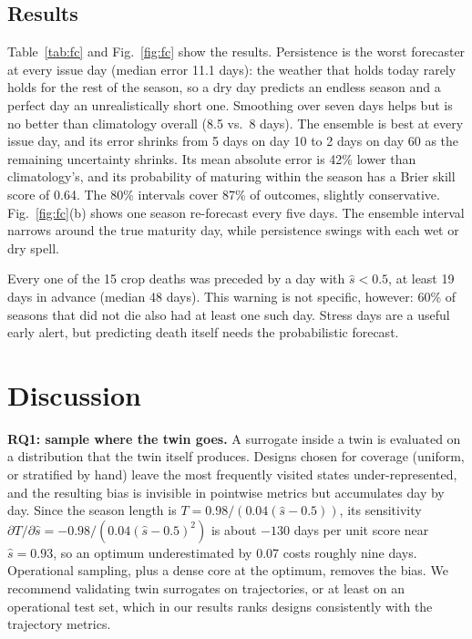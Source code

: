 \documentclass[conference]{IEEEtran}
\begin{document}
\subsection{Results}
Table~\ref{tab:fc} and Fig.~\ref{fig:fc} show the results. Persistence is the worst forecaster at
every issue day (median error 11.1 days): the weather that holds today rarely holds for the
rest of the season, so a dry day predicts an endless season and a perfect day an unrealistically
short one. Smoothing over seven days helps but is no better than climatology overall
(8.5 vs.\ 8 days). The ensemble is best
at every issue day, and its error shrinks from 5 days on day 10 to 2
days on day 60 as the remaining uncertainty shrinks. Its mean absolute error is 42\% lower
than climatology's, and its probability of maturing within the season has a Brier skill score of
0.64. The 80\% intervals cover 87\% of outcomes, slightly conservative.
Fig.~\ref{fig:fc}(b) shows one season re-forecast every five days. The ensemble interval narrows
around the true maturity day, while persistence swings with each wet or dry spell.

Every one of the 15 crop deaths was preceded by a day with $\hat s < 0.5$, at least
19 days in advance (median 48 days). This warning is not specific, however: 60\%
of seasons that did not die also had at least one such day. Stress days are a useful early alert,
but predicting death itself needs the probabilistic forecast.

\section{Discussion}

\textbf{RQ1: sample where the twin goes.} A surrogate inside a twin is evaluated on a distribution
that the twin itself produces. Designs chosen for coverage (uniform, or stratified by hand) leave
the most frequently visited states under-represented, and the resulting bias is invisible in
pointwise metrics but accumulates day by day. Since the season length is
$T = 0.98/(0.04(\hat s - 0.5))$, its sensitivity $\partial T / \partial \hat s = -0.98/(0.04(\hat s - 0.5)^2)$
is about $-130$ days per unit score near $\hat s = 0.93$, so an optimum underestimated by 0.07
costs roughly nine days. Operational sampling, plus a dense core at the optimum, removes the
bias. We recommend validating twin surrogates on trajectories, or at least on an operational
test set, which in our results ranks designs consistently with the trajectory metrics.
\end{document}
